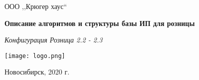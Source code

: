 \begin{titlepage}
\begin{center}
\large
ООО  ,,Крюгер хаус``


\vspace{2.25cm}

\textbf{Описание алгоритмов и структуры базы ИП для розницы}

\textit{Конфигурация Розница 2.2 - 2.3}
\vfill

{\texttt{[image: logo.png]}}

\end{center}
\vfill

\newlength{\ML}


\begin{center}
Новосибирск, 2020 г.
\end{center}
\end{titlepage}